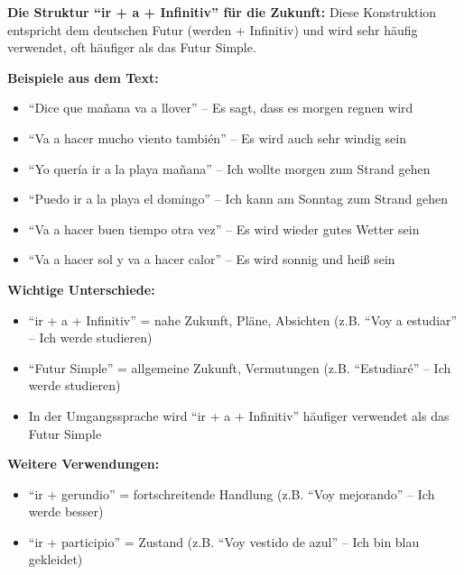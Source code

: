\documentclass[12pt,a4paper]{article}
\begin{document}
\textbf{Die Struktur \enquote{ir + a + Infinitiv} für die Zukunft:}
Diese Konstruktion entspricht dem deutschen Futur (werden + Infinitiv) und wird sehr häufig verwendet, oft häufiger als das Futur Simple.

\textbf{Beispiele aus dem Text:}
\begin{itemize}[leftmargin=*]
    \item \enquote{Dice que mañana va a llover} -- Es sagt, dass es morgen regnen wird
    \item \enquote{Va a hacer mucho viento también} -- Es wird auch sehr windig sein
    \item \enquote{Yo quería ir a la playa mañana} -- Ich wollte morgen zum Strand gehen
    \item \enquote{Puedo ir a la playa el domingo} -- Ich kann am Sonntag zum Strand gehen
    \item \enquote{Va a hacer buen tiempo otra vez} -- Es wird wieder gutes Wetter sein
    \item \enquote{Va a hacer sol y va a hacer calor} -- Es wird sonnig und heiß sein
\end{itemize}

\textbf{Wichtige Unterschiede:}
\begin{itemize}[leftmargin=*]
    \item \enquote{ir + a + Infinitiv} = nahe Zukunft, Pläne, Absichten (z.B. \enquote{Voy a estudiar} -- Ich werde studieren)
    \item \enquote{Futur Simple} = allgemeine Zukunft, Vermutungen (z.B. \enquote{Estudiaré} -- Ich werde studieren)
    \item In der Umgangssprache wird \enquote{ir + a + Infinitiv} häufiger verwendet als das Futur Simple
\end{itemize}

\textbf{Weitere Verwendungen:}
\begin{itemize}[leftmargin=*]
    \item \enquote{ir + gerundio} = fortschreitende Handlung (z.B. \enquote{Voy mejorando} -- Ich werde besser)
    \item \enquote{ir + participio} = Zustand (z.B. \enquote{Voy vestido de azul} -- Ich bin blau gekleidet)
\end{itemize}
\end{document}
